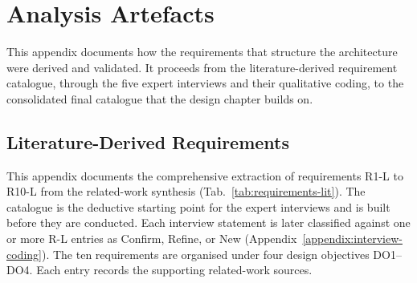 \section{Analysis Artefacts}
\label{appendix:analysis}

This appendix documents how the requirements that structure the architecture were derived and validated. It proceeds from the literature-derived requirement catalogue, through the five expert interviews and their qualitative coding, to the consolidated final catalogue that the design chapter builds on.

\subsection{Literature-Derived Requirements}
\label{appendix:requirements-lit}

This appendix documents the comprehensive extraction of requirements R1-L to R10-L from the related-work synthesis (Tab.~\ref{tab:requirements-lit}). The catalogue is the deductive starting point for the expert interviews and is built before they are conducted. Each interview statement is later classified against one or more R-L entries as Confirm, Refine, or New (Appendix~\ref{appendix:interview-coding}). The ten requirements are organised under four design objectives DO1--DO4. Each entry records the supporting related-work sources.

